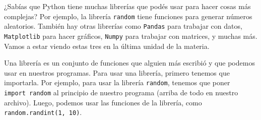 \documentclass[
  letterpaper,
  DIV=11,
  numbers=noendperiod]{scrreprt}
\begin{document}
\begin{tcolorbox}[enhanced jigsaw, colframe=quarto-callout-note-color-frame, opacityback=0, opacitybacktitle=0.6, bottomrule=.15mm, toprule=.15mm, coltitle=black, breakable, colback=white, leftrule=.75mm, titlerule=0mm, bottomtitle=1mm, toptitle=1mm, rightrule=.15mm, title=\textcolor{quarto-callout-note-color}{\faInfo}\hspace{0.5em}{Tip: Librerías}, arc=.35mm, left=2mm, colbacktitle=quarto-callout-note-color!10!white]

¿Sabías que Python tiene muchas librerías que podés usar para hacer
cosas más complejas? Por ejemplo, la librería \texttt{random} tiene
funciones para generar números aleatorios. También hay otras librerías
como \texttt{Pandas} para trabajar con datos, \texttt{Matplotlib} para
hacer gráficos, \texttt{Numpy} para trabajar con matrices, y muchas más.
Vamos a estar viendo estas tres en la última unidad de la materia.

Una librería es un conjunto de funciones que alguien más escribió y que
podemos usar en nuestros programas. Para usar una librería, primero
tenemos que importarla. Por ejemplo, para usar la librería
\texttt{random}, tenemos que poner \texttt{import\ random} al principio
de nuestro programa (arriba de todo en nuestro archivo). Luego, podemos
usar las funciones de la librería, como \texttt{random.randint(1,\ 10)}.

\end{tcolorbox}
\end{document}
